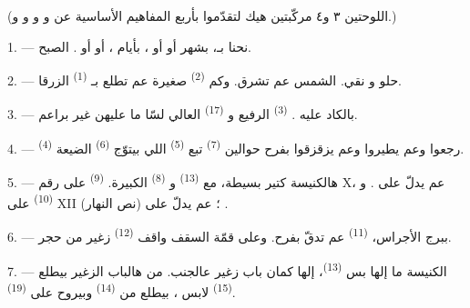 \VUsaut{3.0mm}
\VUsaut{1.6mm}
\VUsaut{3.4mm}

(اللوحتين ٣ و٤ مركّبتين هيك لتقدّموا بأربع 
المفاهيم الأساسية عن  و و
و و.)

\VUsaut{4.0mm}
\VUsaut{3.0mm}

\VUsaut{2.4mm}

\VUsaut{3.0mm}

1. --- نحنا بـ، بشهر  أو  أو
، بأيام ،  أو
 أو .  الصبح.

2. ---  حلو و نقي. الشمس عم تشرق. وكم
 \textsuperscript{(2)} صغيرة عم تطلع بـ
\textsuperscript{(1)} الزرقا.

3. ---  بالكاد عليه . 
\textsuperscript{(3)} الرفيع و \textsuperscript{(17)} العالي
لسّا ما عليهن غير براعم.

4. ---  \textsuperscript{(4)} رجعوا وعم يطيروا وعم
يزقزقوا بفرح حوالين  \textsuperscript{(7)} تبع  \textsuperscript{(5)} اللي بيتوّج 
\textsuperscript{(6)} الضيعة.

\VUsaut{3.4mm}
\VUsaut{3.0mm}

5. --- هالكنيسة كتير بسيطة، مع 
\textsuperscript{(13)} و \textsuperscript{(8)} الكبيرة.
 \textsuperscript{(9)} على رقم X، عم يدلّ على
. و \textsuperscript{(10)} على XII (نص
النهار) ؛ عم يدلّ على .

6. --- ببرج الأجراس،  \textsuperscript{(11)} عم تدقّ
بفرح. وعلى قمّة السقف واقف  \textsuperscript{(12)} زغير من
حجر.

7. --- الكنيسة ما إلها بس  \textsuperscript{(13)}،
إلها كمان باب زغير عالجنب. من هالباب الزغير بيطلع 
\textsuperscript{(15)} لابس ، بيطلع من  \textsuperscript{(14)} وبيروح على 
\textsuperscript{(19)}.

